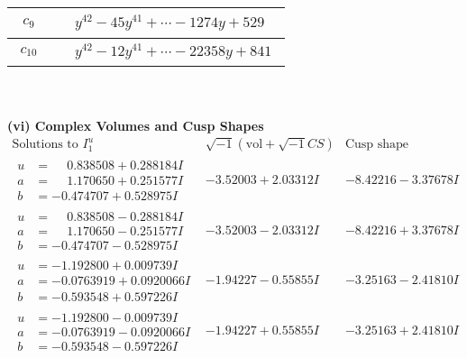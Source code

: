 \documentclass[1p]{elsarticle_modified}
\theoremstyle{definition}
\newcommand{\I}{\sqrt{-1}}
\begin{document}
\begin{tabular}{m{50pt}|m{274pt}}
\hline $$\begin{aligned}c_{9}\end{aligned}$$&$\begin{aligned}
&y^{42}-45 y^{41}+\cdots-1274 y+529
\end{aligned}$\\
\hline $$\begin{aligned}c_{10}\end{aligned}$$&$\begin{aligned}
&y^{42}-12 y^{41}+\cdots-22358 y+841
\end{aligned}$\\
\hline
\end{tabular}\\~\\
\newpage\flushleft \textbf{(vi) Complex Volumes and Cusp Shapes}
$$\begin{array}{c|c|c}  
\text{Solutions to }I^u_{1}& \I (\text{vol} + \sqrt{-1}CS) & \text{Cusp shape}\\
 \hline 
\begin{aligned}
u &= \phantom{-}0.838508 + 0.288184 I \\
a &= \phantom{-}1.170650 + 0.251577 I \\
b &= -0.474707 + 0.528975 I\end{aligned}
 & -3.52003 + 2.03312 I & -8.42216 - 3.37678 I \\ \hline\begin{aligned}
u &= \phantom{-}0.838508 - 0.288184 I \\
a &= \phantom{-}1.170650 - 0.251577 I \\
b &= -0.474707 - 0.528975 I\end{aligned}
 & -3.52003 - 2.03312 I & -8.42216 + 3.37678 I \\ \hline\begin{aligned}
u &= -1.192800 + 0.009739 I \\
a &= -0.0763919 + 0.0920066 I \\
b &= -0.593548 + 0.597226 I\end{aligned}
 & -1.94227 - 0.55855 I & -3.25163 - 2.41810 I \\ \hline\begin{aligned}
u &= -1.192800 - 0.009739 I \\
a &= -0.0763919 - 0.0920066 I \\
b &= -0.593548 - 0.597226 I\end{aligned}
 & -1.94227 + 0.55855 I & -3.25163 + 2.41810 I \\ \hline\begin{aligned}

\end{aligned}
\end{array}$$
\end{document}
